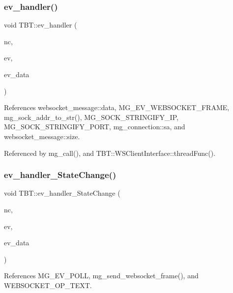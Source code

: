 \subsubsection{\texorpdfstring{ev\+\_\+handler()}{ev\_handler()}}
{\footnotesize\ttfamily void T\+B\+T\+::ev\+\_\+handler (\begin{DoxyParamCaption}\item[{\hyperlink{structmg__connection}{mg\+\_\+connection} $\ast$}]{nc,  }\item[{int}]{ev,  }\item[{void $\ast$}]{ev\+\_\+data }\end{DoxyParamCaption})}



References websocket\+\_\+message\+::data, M\+G\+\_\+\+E\+V\+\_\+\+W\+E\+B\+S\+O\+C\+K\+E\+T\+\_\+\+F\+R\+A\+ME, mg\+\_\+sock\+\_\+addr\+\_\+to\+\_\+str(), M\+G\+\_\+\+S\+O\+C\+K\+\_\+\+S\+T\+R\+I\+N\+G\+I\+F\+Y\+\_\+\+IP, M\+G\+\_\+\+S\+O\+C\+K\+\_\+\+S\+T\+R\+I\+N\+G\+I\+F\+Y\+\_\+\+P\+O\+RT, mg\+\_\+connection\+::sa, and websocket\+\_\+message\+::size.



Referenced by mg\+\_\+call(), and T\+B\+T\+::\+W\+S\+Client\+Interface\+::thread\+Func().

\mbox{\label{namespaceTBT_a13e3d1dea391b442301a95d5bca72caf_a13e3d1dea391b442301a95d5bca72caf}} 
\subsubsection{\texorpdfstring{ev\+\_\+handler\+\_\+\+State\+Change()}{ev\_handler\_StateChange()}}
{\footnotesize\ttfamily void T\+B\+T\+::ev\+\_\+handler\+\_\+\+State\+Change (\begin{DoxyParamCaption}\item[{\hyperlink{structmg__connection}{mg\+\_\+connection} $\ast$}]{nc,  }\item[{int}]{ev,  }\item[{void $\ast$}]{ev\+\_\+data }\end{DoxyParamCaption})}



References M\+G\+\_\+\+E\+V\+\_\+\+P\+O\+LL, mg\+\_\+send\+\_\+websocket\+\_\+frame(), and W\+E\+B\+S\+O\+C\+K\+E\+T\+\_\+\+O\+P\+\_\+\+T\+E\+XT.



